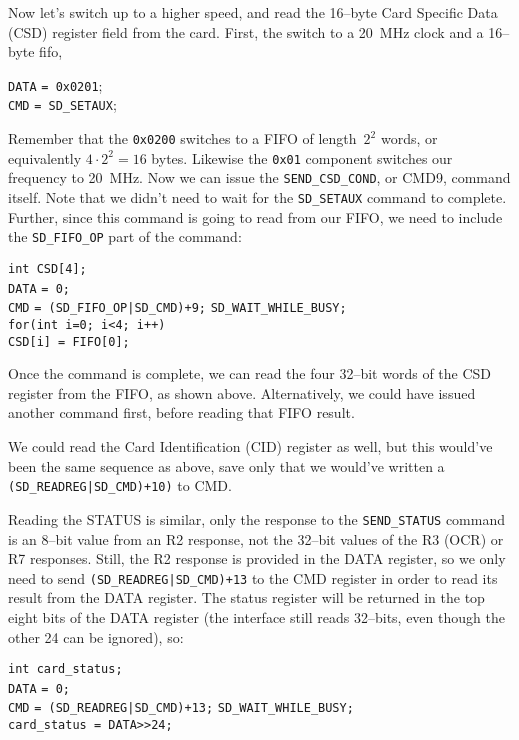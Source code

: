 \documentclass{gqtekspec}
\begin{document}
Now let's switch up to a higher speed, and read the 16--byte Card Specific
Data (CSD) register field from the card.  First, the switch to a 20~MHz clock
and a 16--byte fifo,
\begin{tabbing}
{\tt DATA} \= {\tt = 0x0201}; \\
{\tt CMD} \> {\tt = SD\_SETAUX};
\end{tabbing}
Remember that the {\tt 0x0200} switches to a FIFO of length~$2^2$ words, or
equivalently $4\cdot 2^2=16$ bytes.  Likewise the {\tt 0x01} component switches
our frequency to 20~MHz.  Now we can issue the {\tt SEND\_CSD\_COND}, or
CMD9, command itself.  Note that we didn't need to wait for the {\tt SD\_SETAUX}
command to complete.  Further, since this command is going to read from our
FIFO, we need to include the {\tt SD\_FIFO\_OP} part of the command:
\begin{tabbing}
{\tt int CSD[4];}\\
{\tt DATA} \= {\tt = 0;} \\
{\tt CMD} \> {\tt = (SD\_FIFO\_OP|SD\_CMD)+9;}
{\tt SD\_WAIT\_WHILE\_BUSY;} \\
{\tt for(int i=0; i<4; i++) } \\
\> {\tt CSD[i] = FIFO[0];}
\end{tabbing}
Once the command is complete, we can read the four 32--bit words of the CSD
register from the FIFO, as shown above.  Alternatively, we could have issued
another command first, before reading that FIFO result.

We could read the Card Identification (CID) register as well, but this would've
been the same sequence as above, save only that we would've written a 
{\tt (SD\_READREG|SD\_CMD)+10)} to CMD.

Reading the STATUS is similar, only the response to the {\tt SEND\_STATUS}
command is an 8--bit value from an R2 response, not the 32--bit values of
the R3 (OCR) or R7 responses.  Still, the R2 response is provided in the
DATA register, so we only need to send {\tt (SD\_READREG|SD\_CMD)+13} to
the CMD register in order to read its result from the DATA register.  The status
register will be returned in the top eight bits of the DATA register (the
interface still reads 32--bits, even though the other 24 can be ignored), so:
\begin{tabbing}
{\tt int card\_status;}\\
{\tt DATA} \= {\tt = 0;} \\
{\tt CMD} \> {\tt = (SD\_READREG|SD\_CMD)+13;}
{\tt SD\_WAIT\_WHILE\_BUSY;} \\
{\tt card\_status = DATA>>24;}
\end{tabbing}
\end{document}
